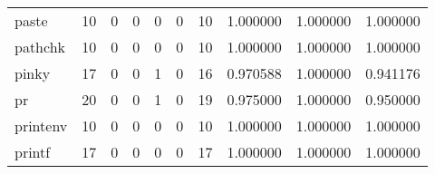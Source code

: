 \begin{longtable}{lrrrrrrrrr}
paste     &                                      10 &                                                  0 &                                                  0 &                                                  0 &                                                  0 &                                                 10 &                                           1.000000 &                               1.000000 &                             1.000000 \\
pathchk   &                                      10 &                                                  0 &                                                  0 &                                                  0 &                                                  0 &                                                 10 &                                           1.000000 &                               1.000000 &                             1.000000 \\
pinky     &                                      17 &                                                  0 &                                                  0 &                                                  1 &                                                  0 &                                                 16 &                                           0.970588 &                               1.000000 &                             0.941176 \\
pr        &                                      20 &                                                  0 &                                                  0 &                                                  1 &                                                  0 &                                                 19 &                                           0.975000 &                               1.000000 &                             0.950000 \\
printenv  &                                      10 &                                                  0 &                                                  0 &                                                  0 &                                                  0 &                                                 10 &                                           1.000000 &                               1.000000 &                             1.000000 \\
printf    &                                      17 &                                                  0 &                                                  0 &                                                  0 &                                                  0 &                                                 17 &                                           1.000000 &                               1.000000 &                             1.000000 \\

\end{longtable}
